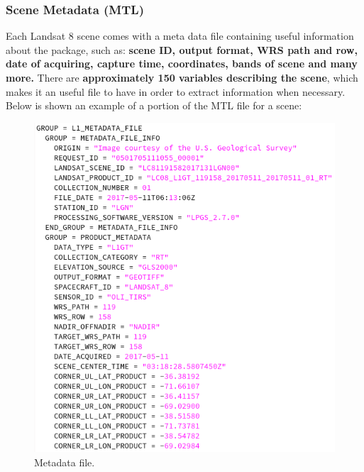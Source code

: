 \documentclass[12pt, a4paper]{report}
\begin{document}
	\subsubsection{Scene Metadata (MTL)}
	Each Landsat 8 scene comes with a meta data file containing useful information about the package, such as: \textbf{scene ID, output format, WRS path and row, date of acquiring, capture time, coordinates, bands of scene and many more.} There are \textbf{approximately 150 variables describing the scene}, which makes it an useful file to have in order to extract information when necessary. Below is shown an example of a portion of the MTL file for a scene:
	\begin{figure}[H]
		\centering
		\includegraphics[scale=2]{metadata_example.png}
		\caption{Metadata file.}
		\label{fig:metadata_file}
	\end{figure}
	
\end{document}

